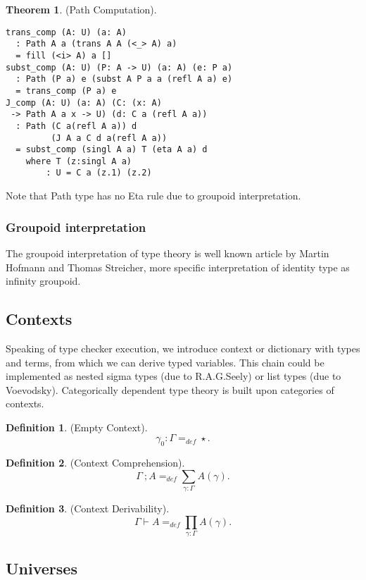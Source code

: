 \documentclass{article}
\theoremstyle{definition}
\newtheorem{theorem}{Theorem}
\newtheorem{definition}{Definition}
\begin{document}
\begin{theorem} (Path Computation).
\begin{lstlisting}
trans_comp (A: U) (a: A)
  : Path A a (trans A A (<_> A) a)
  = fill (<i> A) a []
subst_comp (A: U) (P: A -> U) (a: A) (e: P a)
  : Path (P a) e (subst A P a a (refl A a) e)
  = trans_comp (P a) e
J_comp (A: U) (a: A) (C: (x: A)
 -> Path A a x -> U) (d: C a (refl A a))
  : Path (C a(refl A a)) d
         (J A a C d a(refl A a))
  = subst_comp (singl A a) T (eta A a) d
    where T (z:singl A a)
        : U = C a (z.1) (z.2)
\end{lstlisting}
\end{theorem}

Note that  Path type has no Eta rule due to groupoid interpretation.

\subsubsection{Groupoid interpretation}

The groupoid interpretation of type theory is well known article by Martin Hofmann and Thomas Streicher,
more specific interpretation of identity type as infinity groupoid.

\subsection{Contexts}

Speaking of type checker execution, we introduce context or dictionary with types and terms,
from which we can derive typed variables. This chain could be implemented as
nested sigma types (due to R.A.G.Seely) or list types (due to Voevodsky). Categorically
dependent type theory is built upon categories of contexts.

\begin{definition} (Empty Context).
$$
    \gamma_0 : \Gamma =_{def} \star.
$$
\end{definition}

\begin{definition} (Context Comprehension).
$$
\Gamma\ ; A =_{def} \sum_{\gamma:\Gamma}A(\gamma).
$$
\end{definition}

\begin{definition} (Context Derivability).
$$
\Gamma \vdash A =_{def} \prod_{\gamma:\Gamma}A(\gamma).
$$
\end{definition}

\subsection{Universes}
\end{document}
